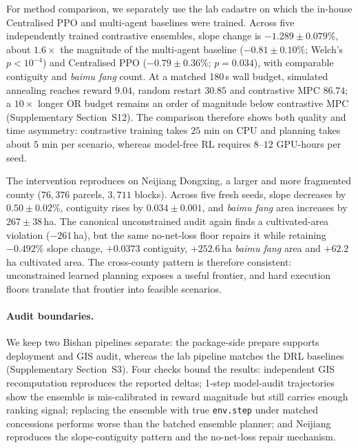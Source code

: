 \documentclass[11pt]{article}
\begin{document}
For method comparison, we separately use the lab cadastre on which the in-house Centralised PPO and multi-agent baselines were trained. Across five independently trained contrastive ensembles, slope change is $-1.289 \pm 0.079\%$, about $1.6\times$ the magnitude of the multi-agent baseline ($-0.81 \pm 0.10\%$; Welch's $p < 10^{-4}$) and Centralised PPO ($-0.79 \pm 0.36\%$; $p = 0.034$), with comparable contiguity and \textit{baimu fang} count. At a matched 180\,s wall budget, simulated annealing reaches reward $9.04$, random restart $30.85$ and contrastive MPC $86.74$; a $10\times$ longer OR budget remains an order of magnitude below contrastive MPC (Supplementary Section~S12). The comparison therefore shows both quality and time asymmetry: contrastive training takes $25$ min on CPU and planning takes about $5$ min per scenario, whereas model-free RL requires $8$--$12$ GPU-hours per seed.

The intervention reproduces on Neijiang Dongxing, a larger and more fragmented county ($76{,}376$ parcels, $3{,}711$ blocks). Across five fresh seeds, slope decreases by $0.50 \pm 0.02\%$, contiguity rises by $0.034 \pm 0.001$, and \textit{baimu fang} area increases by $267 \pm 38$\,ha. The canonical unconstrained audit again finds a cultivated-area violation ($-261$\,ha), but the same no-net-loss floor repairs it while retaining $-0.492\%$ slope change, $+0.0373$ contiguity, $+252.6$\,ha \textit{baimu fang} area and $+62.2$\,ha cultivated area. The cross-county pattern is therefore consistent: unconstrained learned planning exposes a useful frontier, and hard execution floors translate that frontier into feasible scenarios.

\paragraph{Audit boundaries.} We keep two Bishan pipelines separate: the package-side prepare supports deployment and GIS audit, whereas the lab pipeline matches the DRL baselines (Supplementary Section~S3). Four checks bound the results: independent GIS recomputation reproduces the reported deltas; 1-step model-audit trajectories show the ensemble is mis-calibrated in reward magnitude but still carries enough ranking signal; replacing the ensemble with true \texttt{env.step} under matched concessions performs worse than the batched ensemble planner; and Neijiang reproduces the slope-contiguity pattern and the no-net-loss repair mechanism.

\end{document}
